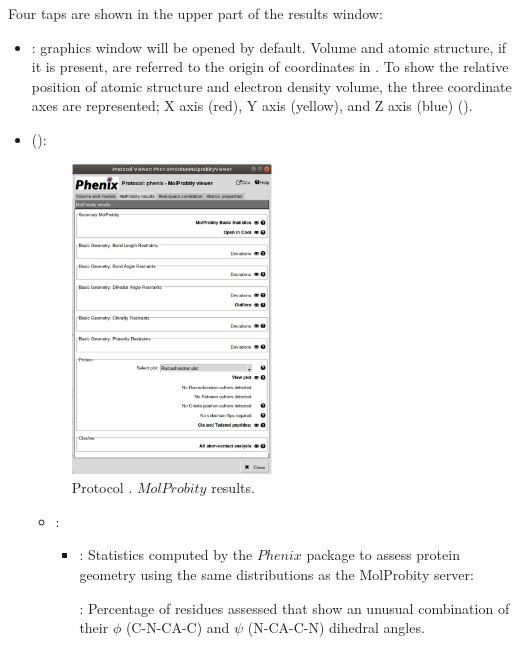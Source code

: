 \begin{itemize}
   Four taps are shown in the upper part of the results window:
   \begin{itemize}
     \item {}: \chimera graphics window will be opened by default. Volume and atomic structure, if it is present, are referred to the origin of coordinates in \chimera. To show the relative position of atomic structure and electron density volume, the three coordinate axes are represented; X axis (red), Y axis (yellow), and Z axis (blue) ().
     \item {} ():
        \begin{figure}[H]
         \centering 
         \captionsetup{width=.9\linewidth} 
         \includegraphics[width=0.50\textwidth]{Images_appendix/Fig145.pdf}
         \caption{Protocol . $MolProbity$ results.}
         \label{fig:app_protocol_molprobity_3}
        \end{figure}
        
        \begin{itemize}
         \item {}: 
          \begin{itemize}
           \item {}: Statistics computed by the $Phenix$ package to assess protein geometry using the same distributions as the MolProbity server:\setlength{\parindent}{12pt}
           
            : Percentage of residues assessed that show an unusual combination of their $\phi$ (C-N-CA-C) and $\psi$ (N-CA-C-N) dihedral angles.
            

\end{itemize}
\end{itemize}
\end{itemize}
\end{itemize}
